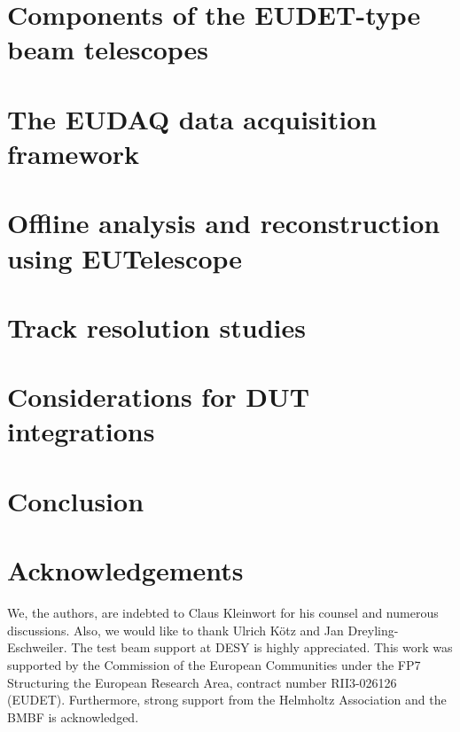 \documentclass[a4paper,10pt]{article}
\begin{document}
\section{Components of the EUDET-type beam telescopes}
\label{sec:tscope}


\section{The EUDAQ data acquisition framework}
\label{sec:eudaq}


\section{Offline analysis and reconstruction using EUTelescope}
\label{sec:offline}


\section{Track resolution studies}
\label{sec:trackres}


\section{Considerations for DUT integrations}
\label{sec:dutintegration}


\section{Conclusion}
\label{sec:conclusion}



\section*{Acknowledgements}
We, the authors, are indebted to Claus Kleinwort for his counsel and numerous discussions. 
Also, we would like to thank Ulrich K\"otz and Jan Dreyling-Eschweiler. 
The test beam support at DESY is highly appreciated. 
This work was supported by the Commission of the European Communities under the FP7 Structuring the European Research Area, contract number RII3-026126 (EUDET). 
Furthermore, strong support from the Helmholtz Association and the BMBF is acknowledged.

\small


\end{document}
